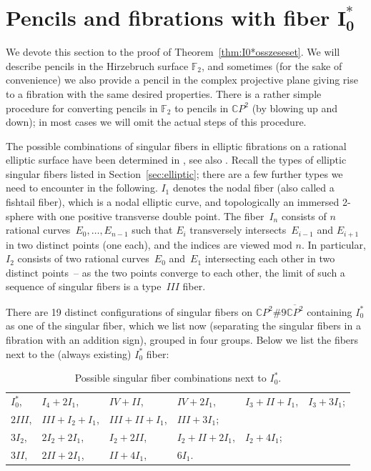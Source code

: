 \documentclass[pdftex]{sigma}
\newcommand{\CP}[1]{\mathbb{C}P^{#1}} %
\numberwithin{equation}{section}
\begin{document}
\section[Pencils and fibrations with fiber $I_0^*$]{Pencils and fibrations with fiber $\boldsymbol{I_0^*}$}\label{sec:app}

We devote this section to the proof of
Theorem~\ref{thm:I0*osszeseset}. We will describe pencils in the
Hirzebruch surface ${\mathbb {F}}_2$, and sometimes (for the sake of
convenience) we also provide a pencil in the complex projective plane
giving rise to a fibration with the same desired properties. There is a
rather simple procedure for converting pencils in ${\mathbb {F}}_2$ to
pencils in $\CP{2}$ (by blowing up and down); in most cases we will
omit the actual steps of this procedure.

The possible combinations of singular fibers in elliptic fibrations on
a rational elliptic surface have been determined in \cite{Miranda, Persson},
see also \cite{SSS}. Recall the types of elliptic singular
fibers listed in Section~\ref{sec:elliptic}; there are a few further
types we need to encounter in the following. $I_1$ denotes the nodal
fiber (also called a fishtail fiber), which is a nodal elliptic curve,
and topologically an immersed 2-sphere with one positive transverse
double point. The fiber~$I_n$ consists of $n$ rational curves~$E_0,
\ldots, E_{n-1}$ such that $E_i$ transversely intersects~$E_{i-1}$ and
$E_{i+1}$ in two distinct points (one each), and the indices are viewed mod
$n$. In particular, $I_2$ consists of two rational curves~$E_0$ and~$E_1$ intersecting each other in two distinct points~-- as the two points
converge to each other, the limit of such a sequence of singular
fibers is a type~$III$ fiber.

There are 19 distinct configurations of singular fibers
on $\CP{2}\# 9 {\overline {\CP{2}}}$ containing $I_0^*$ as one of
the singular fiber, which
we list now (separating the singular fibers in a fibration with an
addition sign), grouped in four groups. Below we list the fibers
next to the (always existing) $I_0^*$ fiber:

\begin{table}[h!]\centering
\begin{tabular}{llllll}
$I_0^*$,& $I_4+2I_1$,& $IV+II$,& $IV+2I_1$, & $I_3+II+I_1$,& $I_3+3I_1$; \\
$2III$,& $III+I_2+I_1$,& $III+II+I_1$,& $III+3I_1$; & &\\
$3I_2$,& $2I_2+2I_1$,& $I_2+2II$,& $I_2 +II +2I_1$,& $I_2+4I_1$; & \\
$3II$,& $2II+2I_1$,& $II+4I_1$,& $6I_1$. & &
\end{tabular}
\caption{Possible singular fiber combinations next to $I_0^*$.}\label{tab:singfibers}
\end{table}
\end{document}

